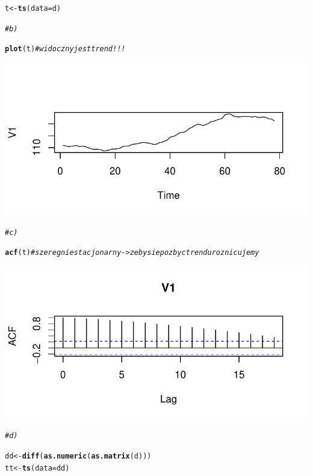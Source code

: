 \documentclass[10pt,a4paper,noindentfirst]{article}\usepackage[]{graphicx}\usepackage[]{color}
\makeatletter
\def\maxwidth{ %
  \ifdim\Gin@nat@width>\linewidth
    \linewidth
  \else
    \Gin@nat@width
  \fi
}
\newcommand{\hlcom}[1]{\textcolor[rgb]{0.678,0.584,0.686}{\textit{#1}}}%
\newcommand{\hlstd}[1]{\textcolor[rgb]{0.345,0.345,0.345}{#1}}%
\newcommand{\hlkwb}[1]{\textcolor[rgb]{0.69,0.353,0.396}{#1}}%
\newcommand{\hlkwc}[1]{\textcolor[rgb]{0.333,0.667,0.333}{#1}}%
\newcommand{\hlkwd}[1]{\textcolor[rgb]{0.737,0.353,0.396}{\textbf{#1}}}%
\newenvironment{kframe}{%
 \def\at@end@of@kframe{}%
 \ifinner\ifhmode%
  \def\at@end@of@kframe{\end{minipage}}%
  \begin{minipage}{\columnwidth}%
 \fi\fi%
 \def\FrameCommand##1{\hskip\@totalleftmargin \hskip-\fboxsep
 \colorbox{shadecolor}{##1}\hskip-\fboxsep
     \hskip-\linewidth \hskip-\@totalleftmargin \hskip\columnwidth}%
 \MakeFramed {\advance\hsize-\width
   \@totalleftmargin\z@ \linewidth\hsize
   \@setminipage}}%
 {\par\unskip\endMakeFramed%
 \at@end@of@kframe}
\newenvironment{knitrout}{}{} %
\makeatother
\begin{document}
\begin{knitrout}
\begin{kframe}
\begin{alltt}
\hlstd{t} \hlkwb{<-} \hlkwd{ts}\hlstd{(}\hlkwc{data}\hlstd{=d)}

\hlcom{# b)}

\hlkwd{plot}\hlstd{(t)}    \hlcom{# widoczny jest trend!!!}
\end{alltt}
\end{kframe}

{\centering \includegraphics[width=\maxwidth]{figure/unnamed-chunk-46} 

}


\begin{kframe}\begin{alltt}
\hlcom{# c)}

\hlkwd{acf}\hlstd{(t)}     \hlcom{# szereg niestacjonarny -> zeby sie pozbyc trendu roznicujemy}
\end{alltt}
\end{kframe}

{\centering \includegraphics[width=\maxwidth]{figure/unnamed-chunk-47} 

}


\begin{kframe}\begin{alltt}
\hlcom{# d)}

\hlstd{dd} \hlkwb{<-} \hlkwd{diff}\hlstd{(}\hlkwd{as.numeric}\hlstd{(}\hlkwd{as.matrix}\hlstd{(d)))}
\hlstd{tt} \hlkwb{<-} \hlkwd{ts}\hlstd{(}\hlkwc{data}\hlstd{=dd)}


\end{alltt}
\end{kframe}
\end{knitrout}
\end{document}
